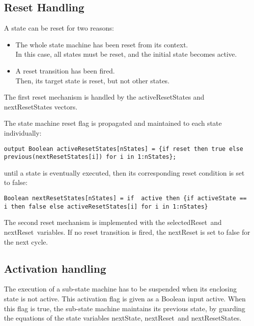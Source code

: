 \subsection{Reset Handling}

A state can be reset for two reasons:

\begin{itemize}
\item
  The whole state machine has been reset from its context.\\
  In this case, all states must be reset, and the initial state becomes
  active.
\item
  A reset transition has been fired.\\
  Then, its target state is reset, but not other states.
\end{itemize}

The first reset mechanism is handled by the activeResetStates and
nextResetStates vectors.

The state machine reset flag is propagated and maintained to each state
individually:

\begin{lstlisting}[language=modelica]
  output Boolean activeResetStates[nStates] = {if reset then true else previous(nextResetStates[i]) for i in 1:nStates};
\end{lstlisting}
until a state is eventually executed, then its corresponding reset
condition is set to false:

\begin{lstlisting}[language=modelica]
  Boolean nextResetStates[nStates] = if  active then {if activeState == i then false else activeResetStates[i] for i in 1:nStates}
\end{lstlisting}
The second reset mechanism is implemented with the selectedReset~and
nextReset~variables. If no reset transition is fired, the nextReset is
set to false for the next cycle.

\subsection{Activation handling}

The execution of a sub-state machine has to be suspended when its
enclosing state is not active. This activation flag is given as a
Boolean input active. When this flag is true, the sub-state machine
maintains its previous state, by guarding the equations of the state
variables nextState, nextReset~and nextResetStates.

